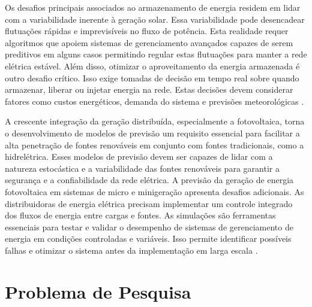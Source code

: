 Os desafios principais associados ao armazenamento de energia residem em lidar com a variabilidade inerente à geração solar. Essa variabilidade pode desencadear flutuações rápidas e imprevisíveis no fluxo de potência. Esta realidade requer algoritmos que apoiem sistemas de gerenciamento avançados capazes de serem preditivos em alguns casos permitindo regular estas flutuações para manter a rede elétrica estável. Além disso, otimizar o aproveitamento da energia armazenada é outro desafio crítico. Isso exige tomadas de decisão em tempo real sobre quando armazenar, liberar ou injetar energia na rede. Estas decisões devem considerar fatores como custos energéticos, demanda do sistema e previsões meteorológicas \cite{castro2016}.

A crescente integração da geração distribuída, especialmente a fotovoltaica, torna o desenvolvimento de modelos de previsão um requisito essencial para facilitar a alta penetração de fontes renováveis em conjunto com fontes tradicionais, como a hidrelétrica. Esses modelos de previsão devem ser capazes de lidar com a natureza estocástica e a variabilidade das fontes renováveis para garantir a segurança e a confiabilidade da rede elétrica. A previsão da geração de energia fotovoltaica em sistemas de micro e minigeração apresenta desafios adicionais. As distribuidoras de energia elétrica precisam implementar um controle integrado dos fluxos de energia entre cargas e fontes. As simulações são ferramentas essenciais para testar e validar o desempenho de sistemas de gerenciamento de energia em condições controladas e variáveis. Isso permite identificar possíveis falhas e otimizar o sistema antes da implementação em larga escala \cite{bastos2020}.
\section{Problema de Pesquisa}
\label{s_cintro_problema_pesquisa}


    

